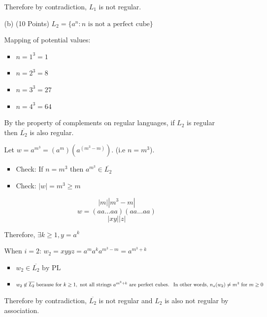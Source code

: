 \documentclass[12pt]{article}
\begin{document}
\begin{spacing}{1.5}
\begin{enumerate}
\begin{enumerate}
                              Therefore by contradiction, $L_1$ is not regular.
                              \newpage
                        \item[(b)] (10 Points) $L_2=\{a^n : n \text{ is not a perfect cube}\}$

                              Mapping of potential values:
                              \begin{itemize}
                                    \item $n=1^3=1$
                                    \item $n=2^3=8$
                                    \item $n=3^3=27$
                                    \item $n=4^3=64$
                              \end{itemize}

                              By the property of complements on regular languages, if $L_2$ is regular then $\overline{L_2}$ is also regular.

                              Let $w=a^{m^3}=(a^m)(a^{(m^3-m)})$. (i.e $n=m^3$).
                              \begin{itemize}
                                    \item Check: If $n=m^3$ then $a^{m^3} \in \overline{L_2}$
                                    \item Check: $|w|=m^3 \geq m$
                              \end{itemize}

                              $$|m||m^3-m|$$
                              $$w=(aa\dots aa)(aa\dots aa)$$
                              $$|xy||z|$$

                              Therefore, $\exists k \geq 1, y=a^k$

                              When $i=2$: $w_2=xyyz = a^ma^ka^{m^3-m}=a^{m^3+k} $

                              \begin{itemize}
                                    \item $w_2 \in \overline{L_2} \text{ by PL}$
                                    \item $w_2 \not\in \overline{L_2} \text{ because for } k \geq 1, \text{ not all strings } a^{m^3+k} \text{ are perfect cubes. } \\ \text{ In other words, } n_a(w_2) \neq m^3 \text{ for } m \geq 0$
                              \end{itemize}

                              Therefore by contradiction, $\overline{L_2}$ is not regular and $L_2$ is also not regular by association.
                  \end{enumerate}

      \end{enumerate}

\end{spacing}
\end{document}
